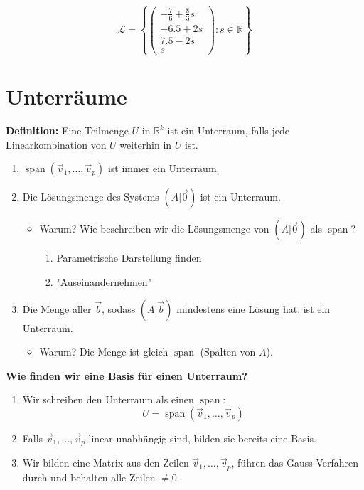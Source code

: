 \documentclass[11pt, openany]{book}
\begin{document}
{\small
\[
\mathcal{L} = \left\{ \begin{pmatrix}
-\frac{7}{6} + \frac{8}{3}s \\
-6.5 + 2s \\
7.5 - 2s \\
s
\end{pmatrix} : s \in \mathbb{R} \right\}
\]}



\section{Unterräume}

\textbf{Definition:} Eine Teilmenge $U$ in $\mathbb{R}^k$ ist ein Unterraum, falls jede Linearkombination von $U$ weiterhin in $U$ ist.

\begin{enumerate}
    \item $\operatorname{span}(\vec{v}_1, \dots, \vec{v}_p)$ ist immer ein Unterraum.
    \item Die Lösungsmenge des Systems $(A|\vec{0})$ ist ein Unterraum.
    \begin{itemize}
        \item Warum? Wie beschreiben wir die Lösungsmenge von $(A|\vec{0})$ als $\operatorname{span}$?
        \begin{enumerate}
            \item Parametrische Darstellung finden
            \item "Auseinandernehmen"
        \end{enumerate}
    \end{itemize}
    \item Die Menge aller $\vec{b}$, sodass $(A|\vec{b})$ mindestens eine Lösung hat, ist ein Unterraum.
    \begin{itemize}
        \item Warum? Die Menge ist gleich $\operatorname{span}$ (Spalten von $A$).
    \end{itemize}
\end{enumerate}

\textbf{Wie finden wir eine Basis für einen Unterraum?}
\begin{enumerate}
    \item Wir schreiben den Unterraum als einen $\operatorname{span}$:
    \[
    U = \operatorname{span}(\vec{v}_1, \dots, \vec{v}_p)
    \]
    \item Falls $\vec{v}_1, \dots, \vec{v}_p$ linear unabhängig sind, bilden sie bereits eine Basis.
    \item Wir bilden eine Matrix aus den Zeilen $\vec{v}_1, \dots, \vec{v}_p$, führen das Gauss-Verfahren durch und behalten alle Zeilen $\neq 0$.
\end{enumerate}
\newpage
\end{document}
